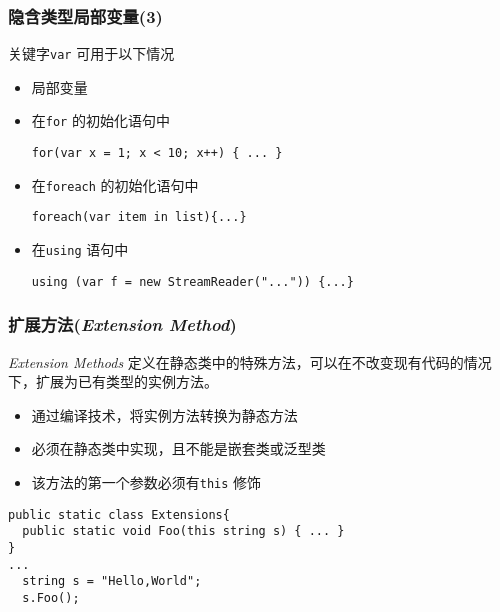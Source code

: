 \begin{frame}[fragile]
\frametitle{隐含类型局部变量(3)}

关键字\texttt{var} 可用于以下情况
\begin{itemize}
\item 局部变量
\item 在\texttt{for} 的初始化语句中
\begin{lstlisting}
for(var x = 1; x < 10; x++) { ... }
\end{lstlisting}
\item 在\texttt{foreach} 的初始化语句中
\begin{lstlisting}
foreach(var item in list){...}
\end{lstlisting}
\item 在\texttt{using} 语句中
\begin{lstlisting}
using (var f = new StreamReader("...")) {...}
\end{lstlisting}
\end{itemize}
\end{frame}


\begin{frame}[fragile]
\frametitle{扩展方法(\textit{Extension Method})}
\begin{block}{\textit{Extension Methods}}
\CJKindent 定义在静态类中的特殊方法，可以在不改变现有代码的情况下，扩展为已有类型的实例方法。
\end{block}

\begin{itemize}
\item 通过编译技术，将实例方法转换为静态方法
\item 必须在静态类中实现，且不能是嵌套类或泛型类
\item 该方法的第一个参数必须有\texttt{this} 修饰
\end{itemize}

\begin{lstlisting}
public static class Extensions{
  public static void Foo(this string s) { ... }
}
...
  string s = "Hello,World";
  s.Foo();
\end{lstlisting}
\end{frame}


